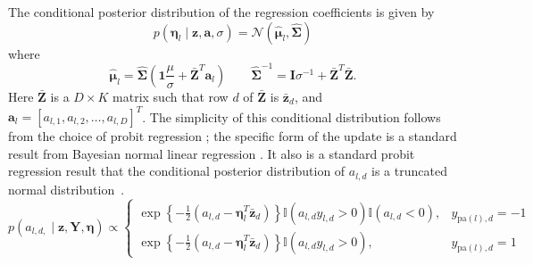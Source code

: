 The conditional posterior distribution of the regression coefficients is given by 
\begin{equation}
p(\boldsymbol\eta_{l}\mid\mathbf{z},\mathbf{a},\sigma) = \mathcal{N}(\hat{\boldsymbol\mu}_{l},\hat{\mathbf{\Sigma}})\label{eqn:regression_param_conditional}
\end{equation}
where
\begin{equation*}
\hat{\boldsymbol\mu}_{l}  =  \hat{\mathbf{\Sigma}}\left(\mathbf{1}\frac{\mu}{\sigma}+\bar{\mathbf{Z}}^{T}\mathbf{a}_{l}\right) \qquad \hat{\mathbf{\Sigma}}^{-1}  =  \mathbf{I}\sigma^{-1}+\bar{\mathbf{Z}}^{T}\bar{\mathbf{Z}}
.\end{equation*}
Here $\bar{\mathbf{Z}}$ is a $D\times K$ matrix
such that row $d$ of $\mathbf{\bar{Z}}$ is $\bar{\mathbf{z}}_{d}$, and $\mathbf{a}_{l}=[a_{l,1},a_{l,2},\ldots,a_{l,D}]^{T}$.  The simplicity of this conditional distribution follows from the choice of probit regression  \citep{Albert_Chib_1993}; the specific form of the update is a standard result from Bayesian normal  linear regression \citep{gelmanbda04}. 
It also is a standard probit regression result that the conditional posterior
distribution of $a_{l,d}$ is a truncated normal
distribution~\cite{Albert_Chib_1993}. 
\begin{equation}
p\left(a_{l,d,}\mid\mathbf{z},\mathbf{Y},\mathbf{\boldsymbol\eta}\right)\propto
\begin{cases}
\exp\left\{ -\frac{1}{2}\left(a_{l,d}-\boldsymbol\eta_{l}^{T}\mathbf{\bar{z}}_{d}\right)\right\} \mathbb{I}\left(a_{l,d}y_{l,d}>0\right)\mathbb{I}(a_{l,d}<0) , & y_{\mathrm{pa}(l),d}=-1\\
\exp\left\{ -\frac{1}{2}\left(a_{l,d}-\boldsymbol\eta_{l}^{T}\mathbf{\bar{z}}_{d}\right)\right\} \mathbb{I}\left(a_{l,d}y_{l,d}>0\right) , & y_{\mathrm{pa}(l),d}=1\end{cases}\end{equation}

